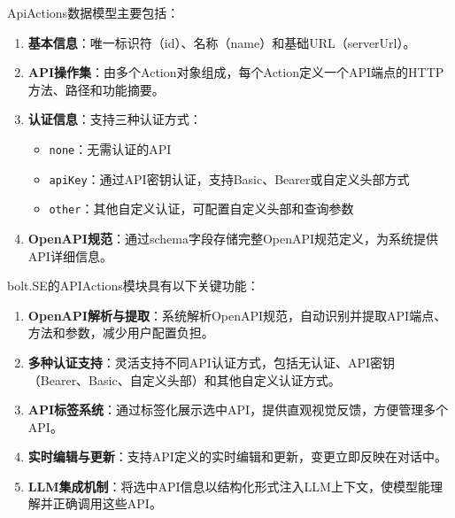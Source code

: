     
    
    

ApiActions数据模型主要包括：

\begin{enumerate}
  \item \textbf{基本信息}：唯一标识符（id）、名称（name）和基础URL（serverUrl）。
  
  \item \textbf{API操作集}：由多个Action对象组成，每个Action定义一个API端点的HTTP方法、路径和功能摘要。
  
  \item \textbf{认证信息}：支持三种认证方式：
    \begin{itemize}
      \item \texttt{none}：无需认证的API
      \item \texttt{apiKey}：通过API密钥认证，支持Basic、Bearer或自定义头部方式
      \item \texttt{other}：其他自定义认证，可配置自定义头部和查询参数
    \end{itemize}
  
  \item \textbf{OpenAPI规范}：通过schema字段存储完整OpenAPI规范定义，为系统提供API详细信息。
\end{enumerate}

bolt.SE的APIActions模块具有以下关键功能：

\begin{enumerate}
  \item \textbf{OpenAPI解析与提取}：系统解析OpenAPI规范，自动识别并提取API端点、方法和参数，减少用户配置负担。
  
  \item \textbf{多种认证支持}：灵活支持不同API认证方式，包括无认证、API密钥（Bearer、Basic、自定义头部）和其他自定义认证方式。
  
  \item \textbf{API标签系统}：通过标签化展示选中API，提供直观视觉反馈，方便管理多个API。
  
  \item \textbf{实时编辑与更新}：支持API定义的实时编辑和更新，变更立即反映在对话中。
  
  \item \textbf{LLM集成机制}：将选中API信息以结构化形式注入LLM上下文，使模型能理解并正确调用这些API。
\end{enumerate}

